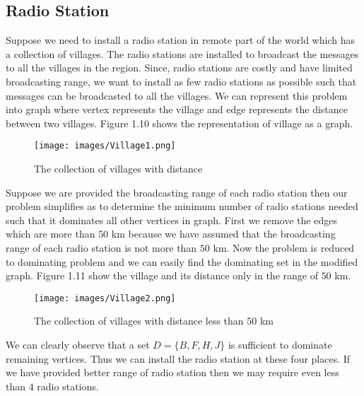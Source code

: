 \subsection{Radio Station}
\noindent
Suppose we need to install a radio station in remote part of the world which has a collection of villages. The radio stations are installed to broadcast the messages to all the villages in the region. Since, radio stations are costly and have limited broadcasting range, we want to install as few radio stations as possible such that messages can be broadcasted to all the villages. We can represent this problem into graph where vertex represents the village and edge represents the distance between two villages. Figure 1.10 shows the representation of village as a graph.
\begin{figure}[H]
\centering
\texttt{[image: images/Village1.png]}
    \caption{The collection of villages with distance }
\end{figure}
\noindent
Suppose we are provided the broadcasting range of each radio station then our problem simplifies as to determine the minimum number of radio stations needed such that it dominates all other vertices in graph. First we remove the edges which are more than $50$ km because we have assumed that the broadcasting range of each radio station is not more than $50$ km. Now the problem is reduced to dominating problem and we can easily find the dominating set in the modified graph. Figure 1.11 show the village and its distance only in the range of $50$ km. 
\begin{figure}[H]
\centering
\texttt{[image: images/Village2.png]}
    \caption{The collection of villages with distance less than $50$ km}
\end{figure}
\noindent
We can clearly observe that a set $D=\{B, F,H,J\}$ is sufficient to dominate remaining vertices. Thus we can install the radio station at these four places. If we have provided better range of radio station then we may require even less than $4$ radio stations.
